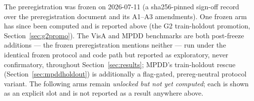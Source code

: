 \documentclass[11pt]{article}
\begin{document}
The preregistration was frozen on 2026-07-11 (a sha256-pinned sign-off record over the
preregistration document and its A1--A3 amendments). One frozen arm
has since been computed and is reported above (the G2 train-holdout promotion,
Section~\ref{sec:g2promo}). The VisA and MPDD benchmarks are both post-freeze additions ---
the frozen preregistration mentions neither --- run under the identical frozen protocol and
code path but reported as exploratory, never confirmatory, throughout
Section~\ref{sec:results}; MPDD's train-holdout rescue (Section~\ref{sec:mpddholdout}) is
additionally a flag-gated, prereg-neutral protocol variant. The following arms remain \emph{unlocked but not yet computed}; each is shown as an explicit
slot and is not reported as a result anywhere above.
\end{document}
